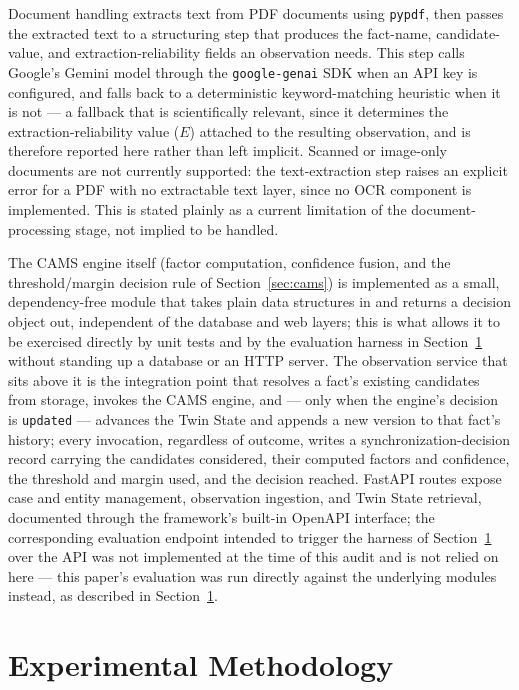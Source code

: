 \documentclass[conference]{IEEEtran}
\begin{document}
Document handling extracts text from PDF documents using \texttt{pypdf},
then passes the extracted text to a structuring step that produces the
fact-name, candidate-value, and extraction-reliability fields an
observation needs. This step calls Google's Gemini model through the
\texttt{google-genai} SDK when an API key is configured, and falls back to
a deterministic keyword-matching heuristic when it is not --- a fallback
that is scientifically relevant, since it determines the
extraction-reliability value ($E$) attached to the resulting observation,
and is therefore reported here rather than left implicit. Scanned or
image-only documents are not currently supported: the text-extraction step
raises an explicit error for a PDF with no extractable text layer, since no
OCR component is implemented. This is stated plainly as a current
limitation of the document-processing stage, not implied to be handled.

The CAMS engine itself (factor computation, confidence fusion, and the
threshold/margin decision rule of Section~\ref{sec:cams}) is implemented as
a small, dependency-free module that takes plain data structures in and
returns a decision object out, independent of the database and web layers;
this is what allows it to be exercised directly by unit tests and by the
evaluation harness in Section~\ref{sec:method} without standing up a
database or an HTTP server. The observation service that sits above it is
the integration point that resolves a fact's existing candidates from
storage, invokes the CAMS engine, and --- only when the engine's decision
is \texttt{updated} --- advances the Twin State and appends a new version to
that fact's history; every invocation, regardless of outcome, writes a
synchronization-decision record carrying the candidates considered, their
computed factors and confidence, the threshold and margin used, and the
decision reached. FastAPI routes expose case and entity management,
observation ingestion, and Twin State retrieval, documented through the
framework's built-in OpenAPI interface; the corresponding evaluation
endpoint intended to trigger the harness of Section~\ref{sec:method} over
the API was not implemented at the time of this audit and is not relied on
here --- this paper's evaluation was run directly against the underlying
modules instead, as described in Section~\ref{sec:method}.

\section{Experimental Methodology}
\label{sec:method}
\end{document}
